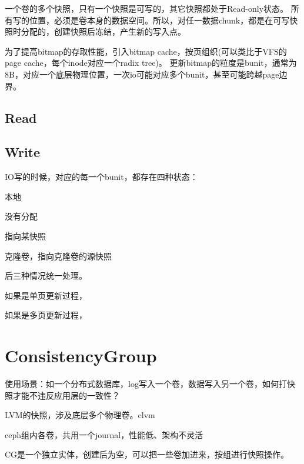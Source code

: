 一个卷的多个快照，只有一个快照是可写的，其它快照都处于Read-only状态。
所有写的位置，必须是卷本身的数据空间。所以，对任一数据chunk，都是在可写快照时分配的，创建快照后冻结，产生新的写入点。

为了提高bitmap的存取性能，引入bitmap cache，按页组织(可以类比于VFS的page cache，每个inode对应一个radix tree)。
更新bitmap的粒度是bunit，通常为8B，对应一个底层物理位置，一次io可能对应多个bunit，甚至可能跨越page边界。

\subsection{Read}

\subsection{Write}

IO写的时候，对应的每一个bunit，都存在四种状态：
\begin{enumbox}
\item 本地
\item 没有分配
\item 指向某快照
\item 克隆卷，指向克隆卷的源快照
\end{enumbox}

后三种情况统一处理。

如果是单页更新过程，

如果是多页更新过程，

\section{ConsistencyGroup}

使用场景：如一个分布式数据库，log写入一个卷，数据写入另一个卷，如何打快照才能不违反应用层的一致性？

LVM的快照，涉及底层多个物理卷。clvm

ceph组内各卷，共用一个journal，性能低、架构不灵活

CG是一个独立实体，创建后为空，可以把一些卷加进来，按组进行快照操作。
